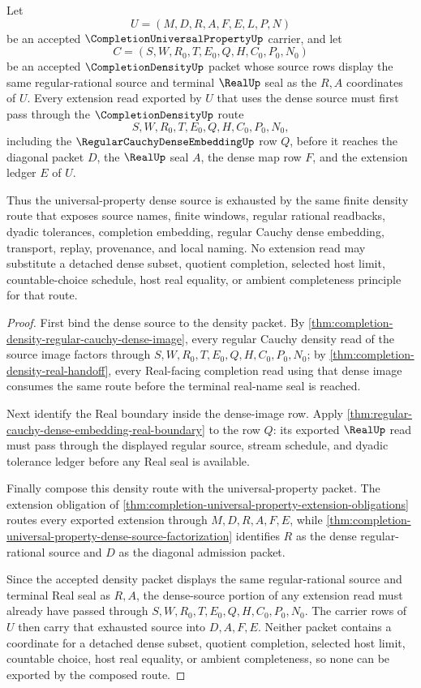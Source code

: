 \begin{theorem}
\label{thm:completion-universal-property-dense-source-exhaustion}
Let
$$
U=(M,D,R,A,F,E,L,P,N)
$$
be an accepted $\CompletionUniversalPropertyUp$ carrier, and let
$$
C=(S,W,R_0,T,E_0,Q,H,C_0,P_0,N_0)
$$
be an accepted $\CompletionDensityUp$ packet whose source rows display the same regular-rational source and terminal $\RealUp$ seal as the $R,A$ coordinates of $U$. Every extension read exported by $U$ that uses the dense source must first pass through the $\CompletionDensityUp$ route
$$
S,W,R_0,T,E_0,Q,H,C_0,P_0,N_0,
$$
including the $\RegularCauchyDenseEmbeddingUp$ row $Q$, before it reaches the diagonal packet $D$, the $\RealUp$ seal $A$, the dense map row $F$, and the extension ledger $E$ of $U$.

Thus the universal-property dense source is exhausted by the same finite density route that exposes source names, finite windows, regular rational readbacks, dyadic tolerances, completion embedding, regular Cauchy dense embedding, transport, replay, provenance, and local naming. No extension read may substitute a detached dense subset, quotient completion, selected host limit, countable-choice schedule, host real equality, or ambient completeness principle for that route.
\end{theorem}
\begin{proof}
First bind the dense source to the density packet. By \autoref{thm:completion-density-regular-cauchy-dense-image}, every regular Cauchy density read of the source image factors through $S,W,R_0,T,E_0,Q,H,C_0,P_0,N_0$; by \autoref{thm:completion-density-real-handoff}, every Real-facing completion read using that dense image consumes the same route before the terminal real-name seal is reached.

Next identify the Real boundary inside the dense-image row. Apply \autoref{thm:regular-cauchy-dense-embedding-real-boundary} to the row $Q$: its exported $\RealUp$ read must pass through the displayed regular source, stream schedule, and dyadic tolerance ledger before any Real seal is available.

Finally compose this density route with the universal-property packet. The extension obligation of \autoref{thm:completion-universal-property-extension-obligations} routes every exported extension through $M,D,R,A,F,E$, while \autoref{thm:completion-universal-property-dense-source-factorization} identifies $R$ as the dense regular-rational source and $D$ as the diagonal admission packet.

Since the accepted density packet displays the same regular-rational source and terminal Real seal as $R,A$, the dense-source portion of any extension read must already have passed through $S,W,R_0,T,E_0,Q,H,C_0,P_0,N_0$. The carrier rows of $U$ then carry that exhausted source into $D,A,F,E$. Neither packet contains a coordinate for a detached dense subset, quotient completion, selected host limit, countable choice, host real equality, or ambient completeness, so none can be exported by the composed route.
\end{proof}

